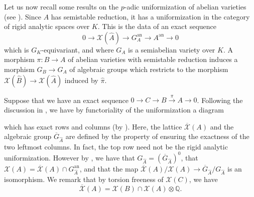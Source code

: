 \documentclass[a4paper, notitlepage, 10pt]{amsart}
\theoremstyle{plain} %
\theoremstyle{definition} %
\theoremstyle{remark} %
\numberwithin{equation}{section}
\newcommand{\bbQ}{\mathbb Q}
\begin{document}
Let us now recall some results on the $p$-adic uniformization of abelian varieties (see \cite[\S 3]{Em03}). Since $A$ has semistable reduction, it has a uniformization in the category of rigid analytic spaces over $K$. This is the data of an exact sequence
    $$ 0 \to \mathcal{X}(\hat{A}) \to G_A^{\text{an}} \to A^{\text{an}} \to 0 $$
which is $G_{K}$-equivariant, and where $G_A$ is a semiabelian variety over $K$. A morphism $\pi\colon B\to A$ of abelian varieties with semistable reduction induces a morphism $G_B\to G_A$ of algebraic groups which restricts to the morphism $\mathcal{X}(\hat{B})\to \mathcal{X}(\hat{A})$ induced by $\hat{\pi}$. 

Suppose that we have an exact sequence $0\to C \to B \xrightarrow{\pi} A \to 0$. Following the discussion in \cite[\S 3]{Em03}, we have by functoriality of the uniformization a diagram
    \begin{center}
    \end{center}
which has exact rows and columns (by \cite[Lemma 3.1]{Em03}). Here, the lattice $\overline{\mathcal{X}}(A)$ and the algebraic group $\overline{G}_{\hat{A}} $ are defined by the property of ensuring the exactness of the two leftmost columns. In fact, the top row need not be the rigid analytic uniformization. However by \cite[Lemma 3.2]{Em03}, we have that $G_{\hat{A}}=(\overline{G}_{\hat{A}})^0$, that $\mathcal{X}(A)=\overline{\mathcal{X}}(A)\cap G_{\hat{{A}}}^{\mathrm{an}}$, and that the map $\overline{\mathcal{X}}(A)/\mathcal{X}(A)\to \overline{G}_{\hat{{A}}}/G_{\hat{A}}$ is an isomorphism. We remark that by torsion freeness of $\mathcal{X}(C)$, we have  
\begin{equation}\label{saturation}
\overline{\mathcal{X}}(A)= \mathcal{X}(B) \cap \mathcal{X}(A)\otimes\bbQ.
\end{equation}
\end{document}
